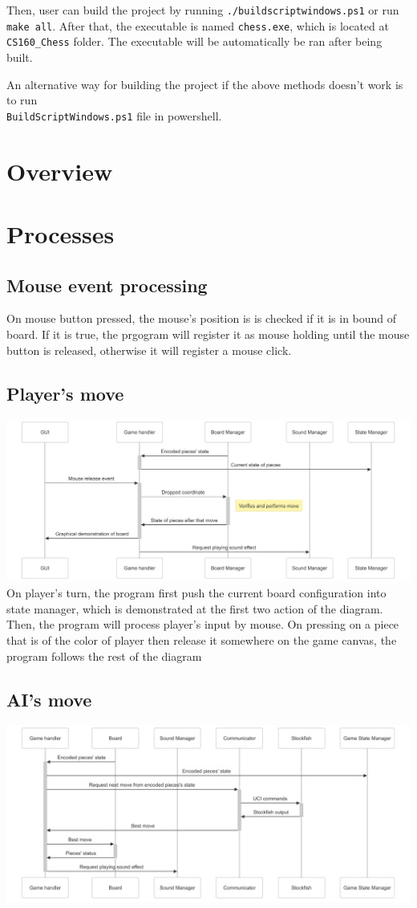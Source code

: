 \documentclass[a4paper, 10pt, titlepage]{report}
\begin{document}
Then, user can build the project by running \texttt{./buildscriptwindows.ps1} or run \texttt{make all}. After that, the executable is named \texttt{chess.exe}, which is located at \texttt{CS160\_Chess} folder. The executable will be automatically be ran after being built.

An alternative way for building the project if the above methods doesn't work is to run \\ \texttt{BuildScriptWindows.ps1} file in powershell. 

\section{Overview}


\section{Processes}
\subsection{Mouse event processing}
On mouse button pressed, the mouse's position is is checked if it is in bound of board. If it is true, the prgogram will register it as mouse holding until the mouse button is released, otherwise it will register a mouse click.
\subsection{Player's move}
\includegraphics[width = \linewidth]{MOve diagram.png}
On player's turn, the program first push the current board configuration into state manager, which is demonstrated at the first two action of the diagram. Then, the program will process player's input by mouse. On pressing on a piece that is of the color of player then release it somewhere on the game canvas, the program follows the rest of the diagram
\subsection{AI's move}
\includegraphics[width = \linewidth]{AI move.png}
\end{document}
